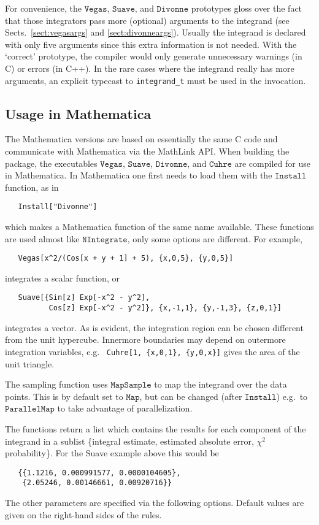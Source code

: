 \documentclass[12pt]{article}
\newcommand\eg{e.g.\ }
\newcommand\Code[1]{\ensuremath{\texttt{#1}}}
\begin{document}
For convenience, the \Code{Vegas}, \Code{Suave}, and \Code{Divonne}
prototypes gloss over the fact that those integrators pass more
(optional) arguments to the integrand (see Sects.\ \ref{sect:vegasargs}
and \ref{sect:divonneargs}).  Usually the integrand is declared with
only five arguments since this extra information is not needed.  With
the `correct' prototype, the compiler would only generate unnecessary
warnings (in C) or errors (in C++).  In the rare cases where the
integrand really has more arguments, an explicit typecast to
\verb=integrand_t= must be used in the invocation.


\subsection{Usage in Mathematica}

The Mathematica versions are based on essentially the same C code and
communicate with Mathematica via the MathLink API.  When building the
package, the executables \Code{Vegas}, \Code{Suave},
\Code{Divonne}, and \Code{Cuhre} are compiled for use in
Mathematica.  In Mathematica one first needs to load them with the 
\Code{Install} function, as in
\begin{verbatim}
   Install["Divonne"]
\end{verbatim}
which makes a Mathematica function of the same name available.  These 
functions are used almost like \Code{NIntegrate}, only some options 
are different.  For example,
\begin{verbatim}
   Vegas[x^2/(Cos[x + y + 1] + 5), {x,0,5}, {y,0,5}]
\end{verbatim}
integrates a scalar function, or
\begin{verbatim}
   Suave[{Sin[z] Exp[-x^2 - y^2],
          Cos[z] Exp[-x^2 - y^2]}, {x,-1,1}, {y,-1,3}, {z,0,1}]
\end{verbatim}
integrates a vector.  As is evident, the integration region can be 
chosen different from the unit hypercube.  Innermore boundaries may 
depend on outermore integration variables, \eg
\verb=Cuhre[1, {x,0,1}, {y,0,x}]= gives the area of the unit triangle.

The sampling function uses \Code{MapSample} to map the integrand
over the data points.  This is by default set to \Code{Map}, but
can be changed (after \Code{Install}) \eg to \Code{ParallelMap}
to take advantage of parallelization.

The functions return a list which contains the results for each
component of the integrand in a sublist \{integral estimate, estimated 
absolute error, $\chi^2$ probability\}.  For the Suave example above 
this would be
\begin{verbatim}
   {{1.1216, 0.000991577, 0.0000104605}, 
    {2.05246, 0.00146661, 0.00920716}}
\end{verbatim}
The other parameters are specified via the following options.  Default 
values are given on the right-hand sides of the rules.
\end{document}

